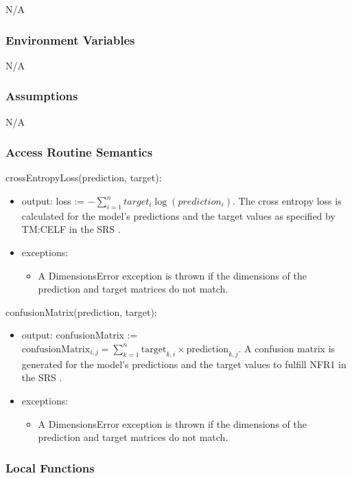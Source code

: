 \documentclass[12pt, titlepage]{article}
\begin{document}
\begin{itemize}
N/A

\subsubsection{Environment Variables}

N/A

\subsubsection{Assumptions}

N/A

\subsubsection{Access Routine Semantics}

\noindent crossEntropyLoss(prediction, target):
\begin{itemize}
\item output: loss := $- \sum_{i=1}^{n} target_i \log(prediction_i)$. The cross
entropy loss is calculated for the model's predictions and the target values
as specified by TM:CELF in the SRS \cite[4.2.2]{SRS}.
\item exceptions:
\begin{itemize}
  \item A DimensionsError exception is thrown if the dimensions of the prediction
  and target matrices do not match.
\end{itemize}
\end{itemize}

\noindent confusionMatrix(prediction, target):
\begin{itemize}
\item output: confusionMatrix := $\text{confusionMatrix}_{i,j} = \sum_{k=1}^{n} \text{target}_{k,i} \times \text{prediction}_{k,j}$. A confusion matrix is generated for the
model's predictions and the target values to fulfill NFR1 in the SRS
\cite[5.2]{SRS}.
\item exceptions:
\begin{itemize}
  \item A DimensionsError exception is thrown if the dimensions of the prediction
  and target matrices do not match.
\end{itemize}
\end{itemize}

\subsubsection{Local Functions}


\end{itemize}
\end{document}
